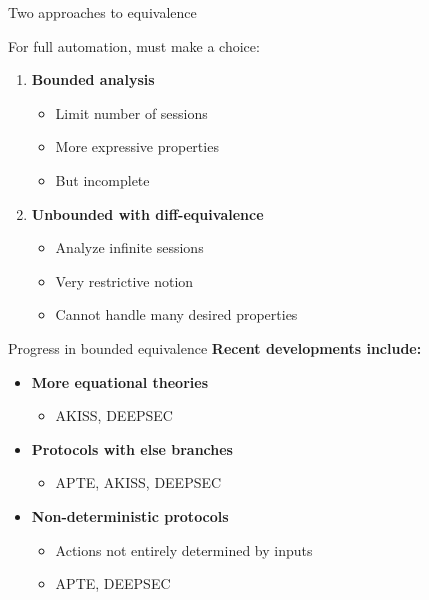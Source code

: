 \documentclass[aspectratio=169, lualatex, handout]{beamer}
\begin{document}
\begin{frame}{Two approaches to equivalence}
	\begin{center}
		\Large
		For full automation, must make a choice:
	\end{center}
	\vspace{1em}
	\begin{enumerate}
		\item \textbf{Bounded analysis}
		      \begin{itemize}
			      \item Limit number of sessions
			      \item More expressive properties
			      \item But incomplete
		      \end{itemize}
		      \vspace{0.5em}
		\item \textbf{Unbounded with diff-equivalence}
		      \begin{itemize}
			      \item Analyze infinite sessions
			      \item Very restrictive notion
			      \item Cannot handle many desired properties
		      \end{itemize}
	\end{enumerate}
\end{frame}

\begin{frame}{Progress in bounded equivalence}
	\textbf{Recent developments include:}
	\vspace{0.5em}
	\begin{itemize}
		\item \textbf{More equational theories}
		      \begin{itemize}
			      \item AKISS, DEEPSEC
		      \end{itemize}
		\item \textbf{Protocols with else branches}
		      \begin{itemize}
			      \item APTE, AKISS, DEEPSEC
		      \end{itemize}
		\item \textbf{Non-deterministic protocols}
		      \begin{itemize}
			      \item Actions not entirely determined by inputs
			      \item APTE, DEEPSEC
		      \end{itemize}
	\end{itemize}
\end{frame}
\end{document}
